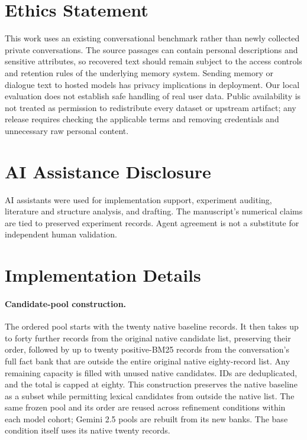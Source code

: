 \documentclass[11pt]{article}
\begin{document}
\section*{Ethics Statement}
This work uses an existing conversational benchmark rather than newly collected private conversations. The source passages can contain personal descriptions and sensitive attributes, so recovered text should remain subject to the access controls and retention rules of the underlying memory system. Sending memory or dialogue text to hosted models has privacy implications in deployment. Our local evaluation does not establish safe handling of real user data. Public availability is not treated as permission to redistribute every dataset or upstream artifact; any release requires checking the applicable terms and removing credentials and unnecessary raw personal content.

\section*{AI Assistance Disclosure}
AI assistants were used for implementation support, experiment auditing, literature and structure analysis, and drafting. The manuscript's numerical claims are tied to preserved experiment records. Agent agreement is not a substitute for independent human validation.



\appendix
\section{Implementation Details}
\label{app:implementation}
\paragraph{Candidate-pool construction.}
The ordered pool starts with the twenty native baseline records. It then takes up to forty further records from the original native candidate list, preserving their order, followed by up to twenty positive-BM25 records from the conversation's full fact bank that are outside the entire original native eighty-record list. Any remaining capacity is filled with unused native candidates. IDs are deduplicated, and the total is capped at eighty. This construction preserves the native baseline as a subset while permitting lexical candidates from outside the native list. The same frozen pool and its order are reused across refinement conditions within each model cohort; Gemini 2.5 pools are rebuilt from its new banks. The base condition itself uses its native twenty records.
\end{document}
